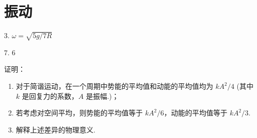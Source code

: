 \chapter{振动}

\begin{oddanswers}
3. $\omega = \sqrt{5g/7R}$

7. $6$
\end{oddanswers}

\begin{exercise}\label{ex:7.1}
证明：
\begin{enumerate}
  \item[(a)] 对于简谐运动，在一个周期中势能的平均值和动能的平均值均为 $kA^2/4$ (其中 $k$ 是回复力的系数，$A$ 是振幅.)；
  \item[(b)] 若考虑对空间平均，则势能的平均值等于 $kA^2/6$，动能的平均值等于 $kA^2/3$.
  \item[(c)] 解释上述差异的物理意义.
\end{enumerate}
\end{exercise}
